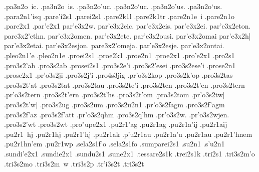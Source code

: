{	.pa3n2o~ic.
	.pa3n2o~is.
	.pa3n2o'uc.
	.pa3n2o`uc.
	.pa3n2o'us.
	.pa3n2o`us.
.para2n1'isq 		%
.pare'i2s1 		%
.parei2s1
.pare2k1l 		%
.pare2k1tr 		%
.pare2n1e~i 		%
.pare2n1o 		%
.pare2x1
.par'e2x1
	par'e3x2w.		%
	par'e3x2eic.
	par'e3x2eis.
	par'e3x2ei.
	par'e3x2eton.
	pare3x2'ethn.
	par'e3x2omen.
	par'e3x2ete.
	par'e3x2ousi.
	par'e3x2omai
	par'e3x2h|
	par'e3x2etai.
	par'e3x2esjon.
	pare3x2'omeja.
	par'e3x2esje.
	par'e3x2ontai.
.pleo2n1'e 		%
.pleo2n1e
.proei2s1 		%
.proe2k1 		%
.proe2n1 		%
.proe2x1 		%
.pro'e2x1 		%
.pro2s1
	.pro3s2'ab 		%
	.pro3s2ab
.prosei2s1 		%
	.pro3s2e'i 		%
	.pro3s2'esei
	.pro3s2ese'i
.prose2n1 		%
.prose2x1 		%
	.pr'o3s2ji 		%
	.pro3s2j'i
		.pro4s3jig 		%
	.pr'o3s2kop 		%
	.pro3s2k'op 
	.pro3s2tas 		%
	.pro3s2t'at 		%
	.pro3s2tat 		%
	.pro3s2tau 		%
	.pro3s2te'i 		%
	.pro3s2ten 		%
	.pro3s2t'en 		%
	.pro3s2tern 		%
	.pr'o3s2tern 		%
	.pro3s2t'ern
	.pro3s2t'hs 		%
	.pro3s2t'om 		%
	.pro3s2tom
	.pr'o3s2tw|		%
	.pro3s2t'w|
	.pro3s2ug 		%
	.pro3s2um 		%
	.pro3s2u2n1 		%
	.pr'o3s2fagm 		%
	.pro3s2f'agm 
	.pro3s2f'az 		%
	.pro3s2f'att 		%
	.pr'o3s2qhm 		%
	.pro3s2q'hm
	.pr'o3s2w.
	.pr'o3s2wjen.
	.pro3s2'wt 		%
	.pro3s2wt
.pro"upe2x1 		%
.pu2r1'ag		%
.pu2r1ag
.pu2r1a'ij   		%
.pu2r1aij		%
.pu2r1~hj 		%
.pu2r1hj 		%
.pu2r1'hj 		%
.pu2r1ak   		%
.p'u2r1au		%
.pu2r1a'u
.pu2r1au 		%
.pu2r1'hnem 		%
.pu2r1hn'em
.pu2r1wp 		%
.sela2s1f'o		%
.sela2s1fo
.sumparei2s1 		%
.su2n1
.s'u2n1	   		%
.sundi'e2x1 		%
.sundie2x1 		%
.sundu2s1 		%
.sune2x1 		%
.tessare2s1k 		%
.trei2s1k 		%
.tri2s1
	.tri3s2m'o 		%
	.tri3s2mo
	.tri3s2m~w
	.tri3s2p 		%
	.tr'i3s2t 		%
	.tri3s2t
}
